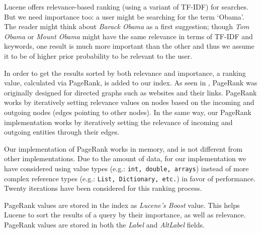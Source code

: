 Lucene offers relevance-based ranking (using a variant of TF-IDF) for searches. But we need importance too: a user might be searching for the term `Obama'. The reader might think about \textit{Barack Obama} as a first suggestion; though \textit{Tom Obama} or \textit{Mount Obama} might have the same relevance in terms of TF-IDF and keywords, one result is much more important than the other and thus we assume it to be of higher prior probability to be relevant to the user.

In order to get the results sorted by both relevance and importance, a ranking value, calculated via PageRank, is added to our index. 
As seen in , PageRank was originally designed for directed graphs such as websites and their links. 
PageRank works by iteratively setting relevance values on nodes based on the incoming and outgoing nodes (edges pointing to other nodes). 
In the same way, our PageRank implementation works by iteratively setting the relevance of incoming and outgoing entities through their edges. 

Our implementation of PageRank works in memory, and is not different from other implementations. 
Due to the amount of data, for our implementation we have considered using value types (e.g.: \texttt{int, double, arrays}) instead of more complex reference types (e.g.: \texttt{List, Dictionary, etc.}) in favor of performance. 
Twenty iterations have been considered for this ranking process.

PageRank values are stored in the index as \textit{Lucene's Boost} value. This helps Lucene to sort the results of a query by their importance, as well as relevance. PageRank values are stored in both the \textit{Label} and \textit{AltLabel} fields.

